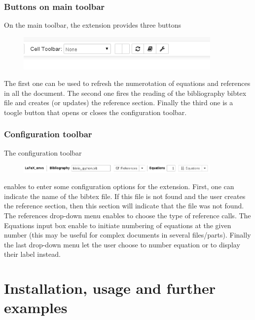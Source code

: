     \subsubsection{Buttons on main toolbar}\label{buttons-on-main-toolbar}

    On the main toolbar, the extension provides three buttons

\begin{figure}[H]
\centerline{\includegraphics[width=10cm]{main_toolbar.png}}
\end{figure}

The first one can be used to refresh the numerotation of equations and
references in all the document. The second one fires the reading of the
bibliography bibtex file and creates (or updates) the reference section.
Finally the third one is a toogle button that opens or closes the
configuration toolbar.

    \subsubsection{Configuration toolbar}\label{configuration-toolbar}

    The configuration toolbar\\

\begin{figure}[H]
\centerline{\includegraphics[width=10cm]{configuration_toolbar.png}}
\end{figure}

enables to enter some configuration options for the extension. First,
one can indicate the name of the bibtex file. If this file is not found
and the user creates the reference section, then this section will
indicate that the file was not found. The references drop-down menu
enables to choose the type of reference calls. The Equations input box
enable to initiate numbering of equations at the given number (this may
be useful for complex documents in several files/parts). Finally the
last drop-down menu let the user choose to number equation or to display
their label instead.

    \section{Installation, usage and further
examples}\label{installation-usage-and-further-examples}

